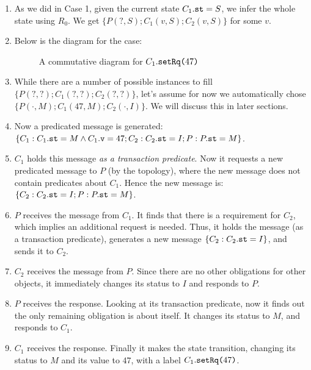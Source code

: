 \documentclass[format=manuscript]{acmart}
\begin{document}
\begin{enumerate}
\item As we did in Case 1, given the current state $C_1.\texttt{st} = S$, we infer
  the whole state using $R_0$. We get $\{ P(?, S); C_1(v, S); C_2(v, S) \}$ for
  some $v$.
\item Below is the diagram for the case:
  \begin{figure}[h]
    \caption{A commutative diagram for $C_1.\texttt{setRq(}47\texttt{)}$}
    \label{fig:comm-diagram-setrq}
  \end{figure}
\item While there are a number of possible instances to fill $\{ P(?, ?); C_1(?,
  ?); C_2(?, ?) \}$, let's assume for now we automatically chose $\{ P(\cdot,
  M); C_1(47, M); C_2(\cdot, I) \}$. We will discuss this in later sections.
\item Now a predicated message is generated: $\{ C_1: C_1.\texttt{st} = M \wedge
  C_1.\texttt{v} = 47; C_2: C_2.\texttt{st} = I; P: P.\texttt{st} = M \}$.
\item $C_1$ holds this message \emph{as a transaction predicate}. Now it
  requests a new predicated message to $P$ (by the topology), where the new
  message does not contain predicates about $C_1$. Hence the new message is: $\{
  C_2: C_2.\texttt{st} = I; P: P.\texttt{st} = M \}$.
\item $P$ receives the message from $C_1$. It finds that there is a requirement
  for $C_2$, which implies an additional request is needed. Thus, it holds the
  message (as a transaction predicate), generates a new message $\{ C_2:
  C_2.\texttt{st} = I \}$, and sends it to $C_2$.
\item $C_2$ receives the message from $P$. Since there are no other obligations
  for other objects, it immediately changes its status to $I$ and responds to
  $P$.
\item $P$ receives the response. Looking at its transaction predicate, now it
  finds out the only remaining obligation is about itself. It changes its status
  to $M$, and responds to $C_1$.
\item $C_1$ receives the response. Finally it makes the state transition,
  changing its status to $M$ and its value to $47$, with a label
  $C_1.\texttt{setRq(}47\texttt{)}$.
\end{enumerate}
\end{document}
